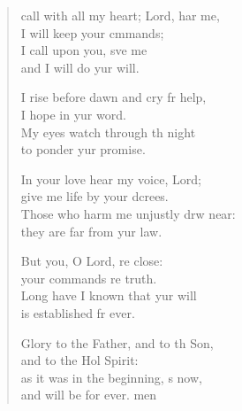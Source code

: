 \begin{verse}
  \begin{patverse}
     call with all my heart; Lord, har me,\Med\\
I will keep your cmmands;\\
I call upon you, sve me\Med\\
and I will do yur will.

I rise before dawn and cry fr help,\Med\\
I hope in yur word.\\
My eyes watch through th night\Med\\
to ponder yur promise.

In your love hear my voice,  Lord;\Med\\
give me life by your dcrees.\\
Those who harm me unjustly drw near:\Med\\
they are far from yur law.

But you, O Lord, re close:\Med\\
your commands re truth.\\
Long have I known that yur will\Med\\
is established fr ever.

Glory to the Father, and to th Son,\Med\\
and to the Hol Spirit:\\
as it was in the beginning, \pointup{\i}s now,\Med\\
and will be for ever. men
  \end{patverse}
\end{verse}
